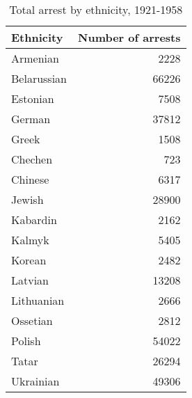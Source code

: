 \begin{table}[ht]

\caption{\label{tab:}Total arrest by ethnicity, 1921-1958}
\centering
\begin{tabular}[t]{lr}
\toprule
Ethnicity & Number of arrests\\
\midrule
Armenian & 2228\\
Belarussian & 66226\\
Estonian & 7508\\
German & 37812\\
Greek & 1508\\
\addlinespace
Chechen & 723\\
Chinese & 6317\\
Jewish & 28900\\
Kabardin & 2162\\
Kalmyk & 5405\\
\addlinespace
Korean & 2482\\
Latvian & 13208\\
Lithuanian & 2666\\
Ossetian & 2812\\
Polish & 54022\\
\addlinespace
Tatar & 26294\\
Ukrainian & 49306\\
\bottomrule
\end{tabular}
\end{table}
